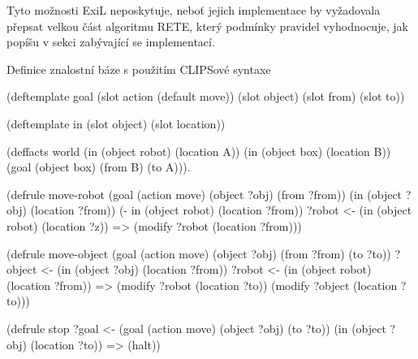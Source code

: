 Tyto možnosti ExiL neposkytuje, neboť jejich implementace by vyžadovala přepsat
velkou část algoritmu RETE, který podmínky pravidel vyhodnocuje, jak popíšu v
sekci zabývající se implementací.

\begin{listing}[t]
\caption{Definice znalostní báze s použitím CLIPSové syntaxe}
\label{clips syntax}
\begin{clcode}
(deftemplate goal
  (slot action (default move))
  (slot object)
  (slot from)
  (slot to))

(deftemplate in
  (slot object)
  (slot location))

(deffacts world
  (in (object robot) (location A))
  (in (object box) (location B))
  (goal (object box) (from B) (to A))).

(defrule move-robot
  (goal (action move) (object ?obj) (from ?from))
  (in (object ?obj) (location ?from))
  (- in (object robot) (location ?from))
  ?robot <- (in (object robot) (location ?z))
  =>
  (modify ?robot (location ?from)))

(defrule move-object
  (goal (action move) (object ?obj) (from ?from) (to ?to))
  ?object <- (in (object ?obj) (location ?from))
  ?robot <- (in (object robot) (location ?from))
  =>
  (modify ?robot (location ?to))
  (modify ?object (location ?to)))

(defrule stop
  ?goal <- (goal (action move) (object ?obj) (to ?to))
  (in (object ?obj) (location ?to))
  =>
  (halt))
\end{clcode}
\end{listing}

\FloatBarrier
